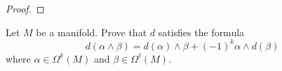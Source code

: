 \documentclass{article}
\newenvironment{problem}[2][Problem]{\begin{trivlist}
\item[\hskip \labelsep {\bfseries #1}\hskip \labelsep {\bfseries #2.}]}{\end{trivlist}}
\begin{document}
\begin{proof}
\end{proof}

\pagebreak

\begin{problem}{5}
  Let $M$ be a manifold. Prove that $d$ satisfies the formula \[
    d(\alpha\wedge\beta) = d(\alpha)\wedge\beta + (-1)^k\alpha\wedge d(\beta)
  \] where $\alpha \in \Omega^k(M)$ and $\beta \in \Omega^\ell(M)$.
\end{problem}
\end{document}
